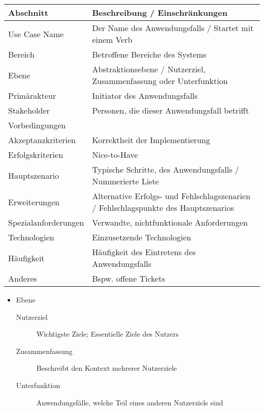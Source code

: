 			\begin{table}[ht]
				\begin{tabular}{l l}
					Abschnitt            & Beschreibung / Einschränkungen                                                      \\
					\hline
					Use Case Name        & Der Name des Anwendungsfalls / Startet mit einem Verb                               \\
					Bereich              & Betroffene Bereiche des Systems                                                     \\
					Ebene                & Abstraktionsebene / Nutzerziel, Zusammenfassung oder Unterfunktion                  \\
					Primärakteur         & Initiator des Anwendungsfalls                                                       \\
					Stakeholder          & Personen, die dieser Anwendungsfall betrifft                                        \\
					Vorbedingungen       &                                                                                     \\
					Akzeptanzkriterien   & Korrektheit der Implementierung                                                     \\
					Erfolgskriterien     & Nice-to-Have                                                                        \\
					Hauptszenario        & Typische Schritte, des Anwendungsfalls / Nummerierte Liste                          \\
					Erweiterungen        & Alternative Erfolgs- und Fehlschlagszenarien / Fehlschlagspunkte des Hauptszenarios \\
					Spezialanforderungen & Verwandte, nichtfunktionale Anforderungen                                           \\
					Technologien         & Einzusetzende Technologien                                                          \\
					Häufigkeit           & Häufigkeit des Eintretens des Anwendungsfalls                                       \\
					Anderes              & Bspw. offene Tickets                                                                \\
				\end{tabular}

				\begin{itemize}
					\item Ebene
						\begin{description}
							\item[Nutzerziel] Wichtigste Ziele; Essentielle Ziele des Nutzers
							\item[Zusammenfassung] Beschreibt den Kontext mehrerer Nutzerziele
							\item[Unterfunktion] Anwendungsfälle, welche Teil eines anderen Nutzerziels sind
						\end{description}
				\end{itemize}
			\end{table}

